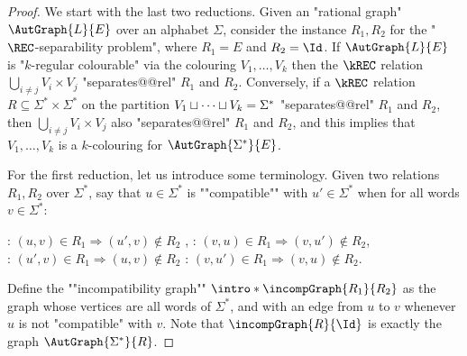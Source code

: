 \begin{proof}
   We start with the last two reductions.
    Given an "rational graph" $\AutGraph{L}{E}$ over an alphabet $\Sigma$, consider the instance $R_1,R_2$ for the "$\REC$-separability problem", where 
    $R_1 = E$ and $R_2 = \Id$. 
    If $\AutGraph{L}{E}$ is "$k$-regular colourable" via the colouring $V_1, \dotsc, V_k$ then the $\kREC$ relation
    $\bigcup_{i \neq j} V_i \times V_j$ "separates@@rel" $R_1$ and $R_2$.
    Conversely, if a $\kREC$ relation $R \subseteq \Sigma^* \times \Sigma^*$ on the partition $V_1 \sqcup \dotsb \sqcup V_k = \Sigma^*$ "separates@@rel" $R_1$ and $R_2$, then $\bigcup_{i \neq j} V_i \times V_j$ also "separates@@rel" $R_1$ and $R_2$, and this implies that $V_1, \dotsc, V_k$ is a $k$-colouring for $\AutGraph{\Sigma^*}{E}$.

\AP For the first reduction, let us introduce some terminology.
Given two relations $R_1,R_2$ over $\Sigma^*$, say that $u \in \Sigma^*$ is ""compatible"" with
$u' \in \Sigma^*$ when for all words $v \in \Sigma^*$:
\begin{center}
    \intro*\compL: $(u,v) \in R_1 \Rightarrow (u',v) \not\in R_2$%
    ,\hphantom{\text{ \fancyand }}
    \intro*\compR: $(v,u) \in R_1 \Rightarrow (v,u') \not\in R_2$,\\
    \intro*\compLpr: $(u',v) \in R_1 \Rightarrow (u,v) \not\in R_2$%
    \hphantom{,}\text{ \fancyand }
    \intro*\compRpr: $(v,u') \in R_1 \Rightarrow (v,u) \not\in R_2$.
\end{center}
\AP
Define the ""incompatibility graph"" $\intro*\incompGraph{R_1}{R_2}$
as the graph whose vertices are all words of $\Sigma^*$,
and with an edge from $u$ to $v$ whenever $u$ is not "compatible" with $v$.
Note that $\incompGraph{R}{\Id}$ is exactly the graph $\AutGraph{\Sigma^*}{R}$.


\end{proof}
